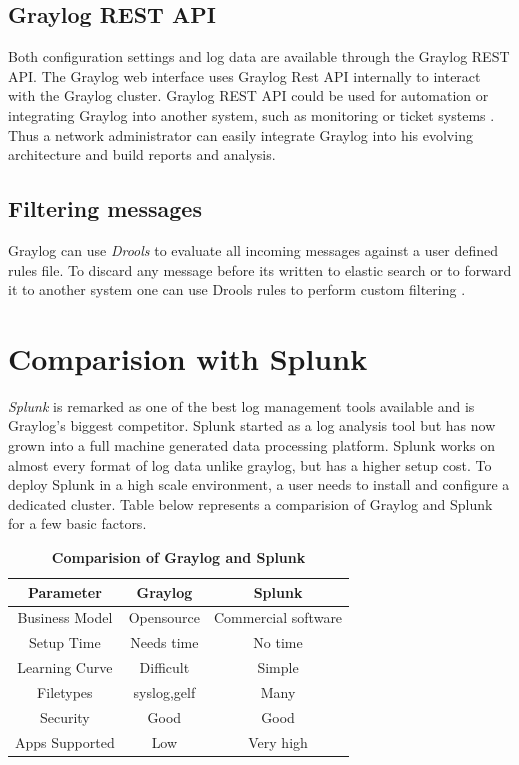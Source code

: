 \documentclass[9pt,twocolumn,twoside]{../../styles/osajnl}
\begin{document}
\subsection{Graylog REST API}

Both configuration settings and log data are available through the
Graylog REST API.  The Graylog web interface uses Graylog Rest API
internally to interact with the Graylog cluster. Graylog REST API
could be used for automation or integrating Graylog into another
system, such as monitoring or ticket systems
\cite{www-graylog-restapi}. Thus a network administrator can easily
integrate Graylog into his evolving architecture and build reports and
analysis.

\subsection{Filtering messages}

Graylog can use \emph{Drools} \cite{www-drools-org} to evaluate all
incoming messages against a user defined rules file. To discard any
message before its written to elastic search or to forward it to
another system one can use Drools rules to perform custom filtering
\cite{www-graylog-blacklisting}.

\section{Comparision with Splunk}
\emph{Splunk} \cite{www-splunk} is remarked as one of the best log
management tools available and is Graylog's biggest competitor. Splunk
started as a log analysis tool but has now grown into a full machine
generated data processing platform. Splunk works on almost every
format of log data unlike graylog, but has a higher setup cost. To
deploy Splunk in a high scale environment, a user needs to install and
configure a dedicated cluster. Table below represents a comparision of
Graylog and Splunk for a few basic factors.

\begin{table}[htbp]
\centering
\caption{\bf Comparision of Graylog and Splunk}\cite{www-logmanagementtools-blog} \cite{www-graylogvssplunk-article}
\begin{tabular}{ccc}
\hline
Parameter & Graylog & Splunk \\
\hline
Business Model& Opensource & Commercial software \\
Setup Time & Needs time & No time\\
Learning Curve & Difficult & Simple\\
Filetypes & syslog,gelf & Many\\
Security & Good & Good\\
Apps Supported & Low & Very high\\
\hline
\end{tabular}
  \label{tab:shape-functions}
\end{table}
\end{document}
